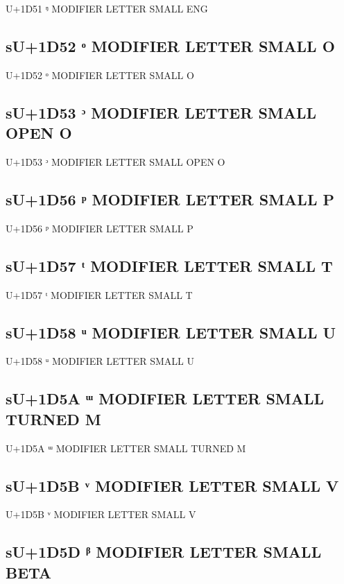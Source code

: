 U+1D51 ᵑ MODIFIER LETTER SMALL ENG

\subsection{sU+1D52 ᵒ MODIFIER LETTER SMALL O}

U+1D52 ᵒ MODIFIER LETTER SMALL O

\subsection{sU+1D53 ᵓ MODIFIER LETTER SMALL OPEN O}

U+1D53 ᵓ MODIFIER LETTER SMALL OPEN O

\subsection{sU+1D56 ᵖ MODIFIER LETTER SMALL P}

U+1D56 ᵖ MODIFIER LETTER SMALL P

\subsection{sU+1D57 ᵗ MODIFIER LETTER SMALL T}

U+1D57 ᵗ MODIFIER LETTER SMALL T

\subsection{sU+1D58 ᵘ MODIFIER LETTER SMALL U}

U+1D58 ᵘ MODIFIER LETTER SMALL U

\subsection{sU+1D5A ᵚ MODIFIER LETTER SMALL TURNED M}

U+1D5A ᵚ MODIFIER LETTER SMALL TURNED M

\subsection{sU+1D5B ᵛ MODIFIER LETTER SMALL V}

U+1D5B ᵛ MODIFIER LETTER SMALL V

\iftestgreek

\subsection{sU+1D5D ᵝ MODIFIER LETTER SMALL BETA}

